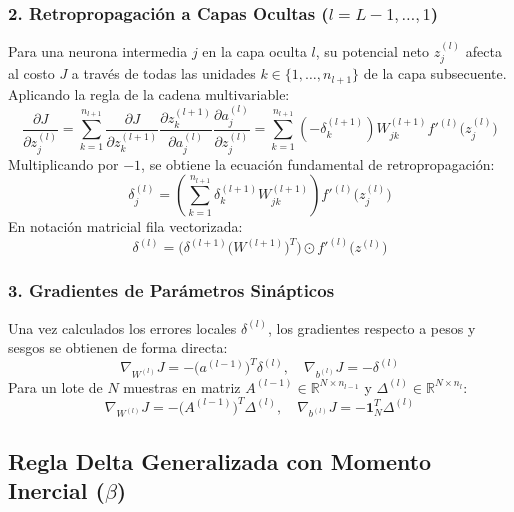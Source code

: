 \documentclass{article}
\begin{document}
\subsubsection{2. Retropropagación a Capas Ocultas ($l = L-1, \dots, 1$)}
Para una neurona intermedia $j$ en la capa oculta $l$, su potencial neto $z_j^{(l)}$ afecta al costo $J$ a través de todas las unidades $k \in \{1, \dots, n_{l+1}\}$ de la capa subsecuente. Aplicando la regla de la cadena multivariable:
\begin{equation}
    \frac{\partial J}{\partial z_j^{(l)}} = \sum_{k=1}^{n_{l+1}} \frac{\partial J}{\partial z_k^{(l+1)}} \frac{\partial z_k^{(l+1)}}{\partial a_j^{(l)}} \frac{\partial a_j^{(l)}}{\partial z_j^{(l)}} = \sum_{k=1}^{n_{l+1}} (-\delta_k^{(l+1)}) W_{jk}^{(l+1)} f'^{(l)}\big(z_j^{(l)}\big)
\end{equation}
Multiplicando por $-1$, se obtiene la ecuación fundamental de retropropagación:
\begin{equation}
    \delta_j^{(l)} = \left( \sum_{k=1}^{n_{l+1}} \delta_k^{(l+1)} W_{jk}^{(l+1)} \right) f'^{(l)}\big(z_j^{(l)}\big) \label{eq:delta_oculta_escalar}
\end{equation}
En notación matricial fila vectorizada:
\begin{equation}
    \delta^{(l)} = \Big( \delta^{(l+1)} \big(W^{(l+1)}\big)^T \Big) \odot f'^{(l)}\big(z^{(l)}\big) \label{eq:delta_vectorizado}
\end{equation}

\subsubsection{3. Gradientes de Parámetros Sinápticos}
Una vez calculados los errores locales $\delta^{(l)}$, los gradientes respecto a pesos y sesgos se obtienen de forma directa:
\begin{equation}
    \nabla_{W^{(l)}} J = -\big(a^{(l-1)}\big)^T \delta^{(l)}, \quad \nabla_{b^{(l)}} J = -\delta^{(l)}
\end{equation}
Para un lote de $N$ muestras en matriz $A^{(l-1)} \in \mathbb{R}^{N \times n_{l-1}}$ y $\Delta^{(l)} \in \mathbb{R}^{N \times n_l}$:
\begin{equation}
    \nabla_{W^{(l)}} J = -\big(A^{(l-1)}\big)^T \Delta^{(l)}, \quad \nabla_{b^{(l)}} J = -\mathbf{1}_N^T \Delta^{(l)}
\end{equation}

\subsection{Regla Delta Generalizada con Momento Inercial ($\beta$)}
\end{document}
